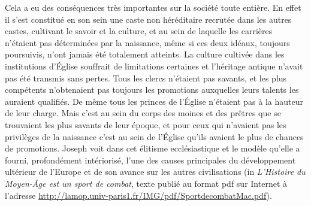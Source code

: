  Cela a eu des conséquences très importantes sur la société toute entière. En effet il s'est constitué en son sein une caste non héréditaire recrutée dans les autres castes, cultivant le savoir et la culture, et au sein de laquelle les carrières n'étaient pas déterminées par la naissance, même si ces deux idéaux, toujours poursuivis, n'ont jamais été totalement atteints. La culture cultivée dans les institutions d'Église souffrait de limitations certaines et l'héritage antique n'avait pas été transmis sans pertes. Tous les clercs n'étaient pas savants, et les plus compétents n'obtenaient pas toujours les promotions auxquelles leurs talents les auraient qualifiés. De même tous les princes de l'Église n'étaient pas à la hauteur de leur charge. Mais c'est au sein du corps des moines et des prêtres que se trouvaient les plus savants de leur époque, et pour ceux qui n'avaient pas les privilèges de la naissance c'est au sein de l'Église qu'ils avaient le plus de chances de promotions. Joseph  voit dans cet élitisme ecclésiastique et le modèle qu'elle a fourni, profondément intériorisé, l'une des causes principales du développement ultérieur de l'Europe et de son avance sur les autres civilisations (in \emph{L'Histoire du Moyen-Âge est un sport de combat}, texte publié au format pdf sur Internet à l'adresse \url{http://lamop.univ-paris1.fr/IMG/pdf/SportdecombatMac.pdf}).
 
 